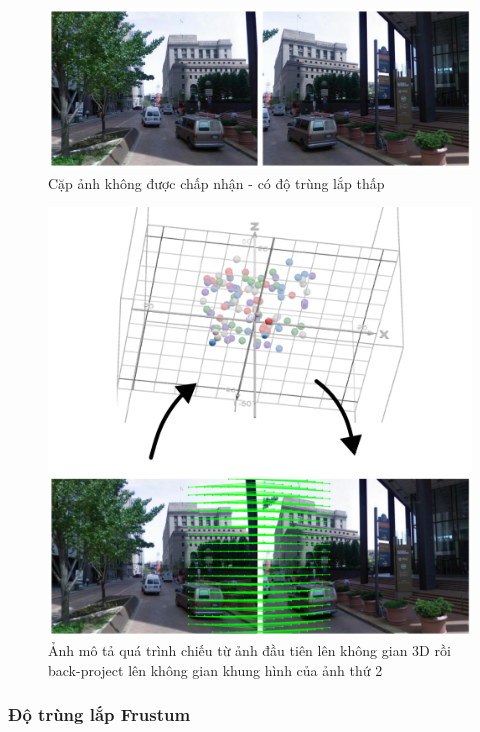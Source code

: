 \begin{figure}
  \centering
  \includegraphics[width=\textwidth]{pics/Chapter3/lowoverlap.png}
  \caption[Cặp ảnh có độ overlap thấp]{Cặp ảnh không được chấp nhận - có độ trùng lắp thấp}
\end{figure}

\begin{figure}
  \centering
  \includegraphics[width=\textwidth]{pics/Proposal/project.drawio.png}
  \caption[Quá trình chiếu giữa 2 ảnh]{Ảnh mô tả quá trình chiếu từ ảnh đầu tiên lên không gian 3D rồi back-project lên không gian khung hình của ảnh thứ 2}
\end{figure}

\subsubsection*{Độ trùng lắp Frustum}

